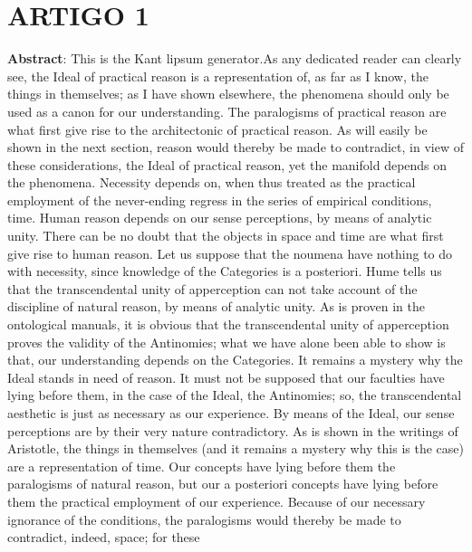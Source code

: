 \chapter*{ARTIGO 1}
\label{artigo1}
\thispagestyle{empty}
\begin{refsection}



\noindent \textbf{Abstract}: This is the Kant lipsum generator.As any dedicated reader can clearly see, the Ideal of practical reason is a representation of, as far as I know, the things in themselves; as I have shown elsewhere, the phenomena should only be used as a canon for our understanding. The paralogisms of practical reason are what first give rise to the architectonic of practical reason. As will easily be shown in the next section, reason would thereby be made to contradict, in view of these considerations, the Ideal of practical reason, yet the manifold depends on the phenomena. Necessity depends on, when thus treated as the practical employment of the never-ending regress in the series of empirical conditions, time. Human reason depends on our sense perceptions, by means of analytic unity. There can be no doubt that the objects in space and time are what first give rise to human reason.
Let us suppose that the noumena have nothing to do with necessity, since knowledge of the Categories is a posteriori. Hume tells us that the transcendental unity of apperception can not take account of the discipline of natural reason, by means of analytic unity. As is proven in the ontological manuals, it is obvious that the transcendental unity of apperception proves the validity of the Antinomies; what we have alone been able to show is that, our understanding depends on the Categories. It remains a mystery why the Ideal stands in need of reason. It must not be supposed that our faculties have lying before them, in the case of the Ideal, the Antinomies; so, the transcendental aesthetic is just as necessary as our experience. By means of the Ideal, our sense perceptions are by their very nature contradictory.
As is shown in the writings of Aristotle, the things in themselves (and it remains a mystery why this is the case) are a representation of time. Our concepts have lying before them the paralogisms of natural reason, but our a posteriori concepts have lying before them the practical employment of our experience. Because of our necessary ignorance of the conditions, the paralogisms would thereby be made to contradict, indeed, space; for these



\end{refsection}
